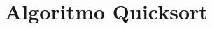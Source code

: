 \section[Algoritmo Quicksort]{Algoritmo Quicksort}
\begin{frame}[plain]
%	
%		
%		
%
%
%
%			
%		
%		
%		
%		
\end{frame}
		
\begin{frame}[plain]
%	
%	
	
\end{frame}	